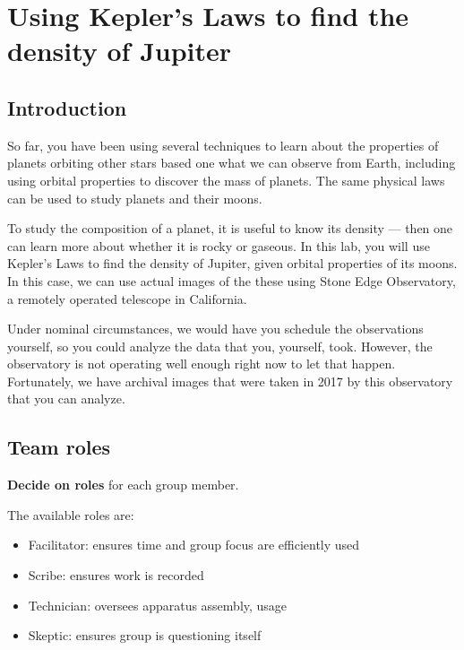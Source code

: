 \chapter{Using Kepler’s Laws to find the density of Jupiter}


\section{Introduction}

So far, you have been using several techniques to learn about the properties of planets orbiting other stars based one what we can observe from Earth, including using orbital properties to discover the mass of planets. The same physical laws can be used to study planets and their moons.

To study the composition of a planet, it is useful to know its density --- then one can learn more about whether it is rocky or gaseous. In this lab, you will use Kepler's Laws to find the density of Jupiter, given orbital properties of its moons. In this case, we can use actual images of the these using Stone Edge Observatory, a remotely operated telescope in California.

Under nominal circumstances, we would have you schedule the observations yourself, so you could analyze the data that you, yourself, took. However, the observatory is not operating well enough right now to let that happen. Fortunately, we have archival images that were taken in 2017 by this observatory that you can analyze.

\section{Team roles}

\begin{steps}
	\item \textbf{Decide on roles} for each group member.
\end{steps}

The available roles are:
\begin{itemize}
	\item Facilitator: ensures time and group focus are efficiently used
	\item Scribe: ensures work is recorded
	\item Technician: oversees apparatus assembly, usage
	\item Skeptic: ensures group is questioning itself
\end{itemize}

